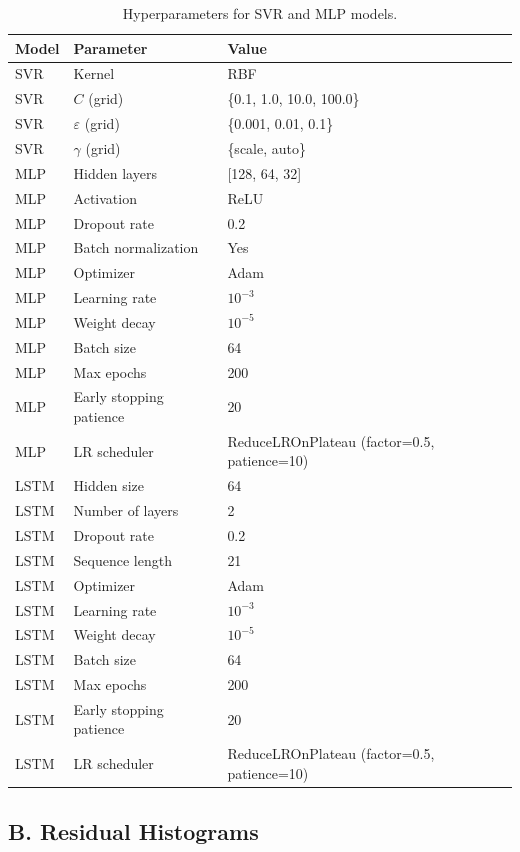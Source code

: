 \documentclass{article}
\begin{document}
\begin{table}[h]
  \caption{Hyperparameters for SVR and MLP models.}
  \label{tab:hyperparams}
  \centering
  \begin{tabular}{lll}
    \toprule
    Model & Parameter & Value \\
    \midrule
    SVR & Kernel & RBF \\
    SVR & $C$ (grid) & \{0.1, 1.0, 10.0, 100.0\} \\
    SVR & $\varepsilon$ (grid) & \{0.001, 0.01, 0.1\} \\
    SVR & $\gamma$ (grid) & \{scale, auto\} \\
    \midrule
    MLP & Hidden layers & [128, 64, 32] \\
    MLP & Activation & ReLU \\
    MLP & Dropout rate & 0.2 \\
    MLP & Batch normalization & Yes \\
    MLP & Optimizer & Adam \\
    MLP & Learning rate & $10^{-3}$ \\
    MLP & Weight decay & $10^{-5}$ \\
    MLP & Batch size & 64 \\
    MLP & Max epochs & 200 \\
    MLP & Early stopping patience & 20 \\
    MLP & LR scheduler & ReduceLROnPlateau (factor=0.5, patience=10) \\
    \midrule
    LSTM & Hidden size & 64 \\
    LSTM & Number of layers & 2 \\
    LSTM & Dropout rate & 0.2 \\
    LSTM & Sequence length & 21 \\
    LSTM & Optimizer & Adam \\
    LSTM & Learning rate & $10^{-3}$ \\
    LSTM & Weight decay & $10^{-5}$ \\
    LSTM & Batch size & 64 \\
    LSTM & Max epochs & 200 \\
    LSTM & Early stopping patience & 20 \\
    LSTM & LR scheduler & ReduceLROnPlateau (factor=0.5, patience=10) \\
    \bottomrule
  \end{tabular}
\end{table}

\subsection*{B. Residual Histograms}
\end{document}
